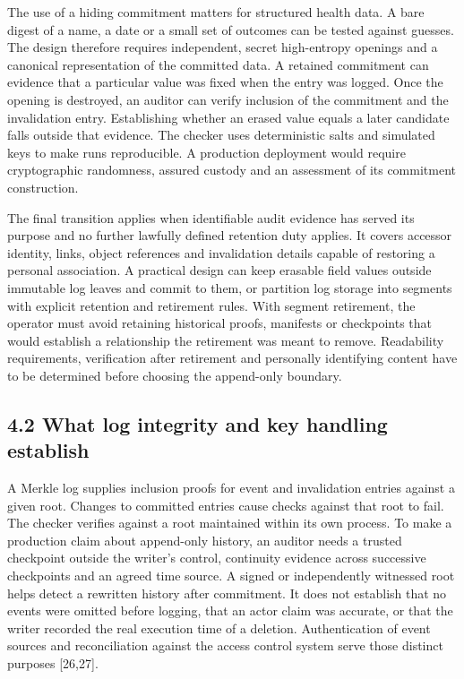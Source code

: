 \documentclass[preprint,review,12pt]{elsarticle}
\begin{document}
The use of a hiding commitment matters for structured health data. A
bare digest of a name, a date or a small set of outcomes can be tested
against guesses. The design therefore requires independent, secret
high-entropy openings and a canonical representation of the committed
data. A retained commitment can evidence that a particular value was
fixed when the entry was logged. Once the opening is destroyed, an
auditor can verify inclusion of the commitment and the invalidation
entry. Establishing whether an erased value equals a later candidate
falls outside that evidence. The checker uses deterministic salts and
simulated keys to make runs reproducible. A production deployment would
require cryptographic randomness, assured custody and an assessment of
its commitment construction.

The final transition applies when identifiable audit evidence has served
its purpose and no further lawfully defined retention duty applies. It
covers accessor identity, links, object references and invalidation
details capable of restoring a personal association. A practical design
can keep erasable field values outside immutable log leaves and commit
to them, or partition log storage into segments with explicit retention
and retirement rules. With segment retirement, the operator must avoid
retaining historical proofs, manifests or checkpoints that would
establish a relationship the retirement was meant to remove. Readability
requirements, verification after retirement and personally identifying
content have to be determined before choosing the append-only boundary.

\hypertarget{what-log-integrity-and-key-handling-establish}{%
\subsection{4.2 What log integrity and key handling
establish}\label{what-log-integrity-and-key-handling-establish}}

A Merkle log supplies inclusion proofs for event and invalidation
entries against a given root. Changes to committed entries cause checks
against that root to fail. The checker verifies against a root
maintained within its own process. To make a production claim about
append-only history, an auditor needs a trusted checkpoint outside the
writer's control, continuity evidence across successive checkpoints and
an agreed time source. A signed or independently witnessed root helps
detect a rewritten history after commitment. It does not establish that
no events were omitted before logging, that an actor claim was accurate,
or that the writer recorded the real execution time of a deletion.
Authentication of event sources and reconciliation against the access
control system serve those distinct purposes {[}26,27{]}.
\end{document}

